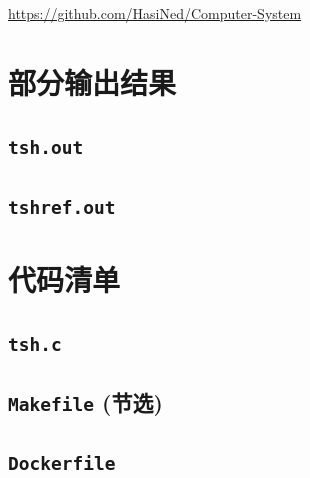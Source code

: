\url{https://github.com/HasiNed/Computer-System}

\setupappendix

\clearpage
\section{部分输出结果}\label{outputs}

\subsection{\texttt{tsh.out}}\label{tsh-out}

\clearpage
\subsection{\texttt{tshref.out}}\label{tshref-out}

\clearpage
\section{代码清单}\label{codelist}

\subsection{\texttt{tsh.c}}\label{tsh-c}

\subsection[\texttt{Makefile}]{\texttt{Makefile} (节选)}\label{makefile}

\subsection{\texttt{Dockerfile}}\label{dockerfile}
